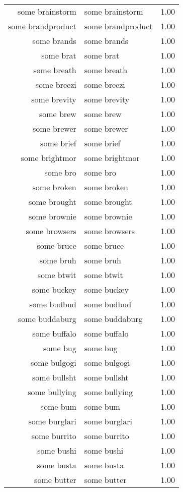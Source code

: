 \begin{table}[ht]
\begin{tabular}{rlr}
  some brainstorm & some brainstorm & 1.00 \\ 
  some brandproduct & some brandproduct & 1.00 \\ 
  some brands & some brands & 1.00 \\ 
  some brat & some brat & 1.00 \\ 
  some breath & some breath & 1.00 \\ 
  some breezi & some breezi & 1.00 \\ 
  some brevity & some brevity & 1.00 \\ 
  some brew & some brew & 1.00 \\ 
  some brewer & some brewer & 1.00 \\ 
  some brief & some brief & 1.00 \\ 
  some brightmor & some brightmor & 1.00 \\ 
  some bro & some bro & 1.00 \\ 
  some broken & some broken & 1.00 \\ 
  some brought & some brought & 1.00 \\ 
  some brownie & some brownie & 1.00 \\ 
  some browsers & some browsers & 1.00 \\ 
  some bruce & some bruce & 1.00 \\ 
  some bruh & some bruh & 1.00 \\ 
  some btwit & some btwit & 1.00 \\ 
  some buckey & some buckey & 1.00 \\ 
  some budbud & some budbud & 1.00 \\ 
  some buddaburg & some buddaburg & 1.00 \\ 
  some buffalo & some buffalo & 1.00 \\ 
  some bug & some bug & 1.00 \\ 
  some bulgogi & some bulgogi & 1.00 \\ 
  some bullsht & some bullsht & 1.00 \\ 
  some bullying & some bullying & 1.00 \\ 
  some bum & some bum & 1.00 \\ 
  some burglari & some burglari & 1.00 \\ 
  some burrito & some burrito & 1.00 \\ 
  some bushi & some bushi & 1.00 \\ 
  some busta & some busta & 1.00 \\ 
  some butter & some butter & 1.00 \\ 

\end{tabular}
\end{table}
